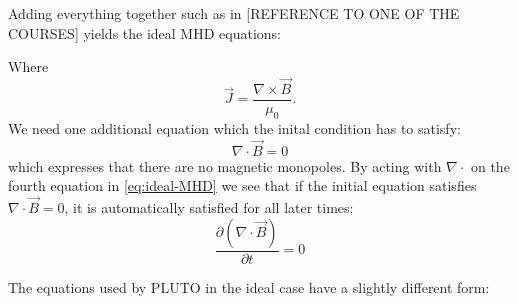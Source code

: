 Adding everything together such as in [REFERENCE TO ONE OF THE COURSES] yields the ideal MHD equations:

{\centering 
\noindent {}
\par}

Where $$\vec{J} = \frac{\nabla\times \vec{B}}{\mu_0}. $$ We need one additional equation which the inital condition has to satisfy:
\begin{equation*}
	\nabla\cdot\vec{B}=0
\end{equation*}
which expresses that there are no magnetic monopoles. By acting with $\nabla\cdot$ on the fourth equation in \autoref{eq:ideal-MHD} we see that if the initial equation satisfies $\nabla\cdot\vec{B}=0$, it is automatically satisfied for all later times:
\begin{equation*}
	\frac{\partial (\nabla\cdot\vec{B})}{\partial t} = 0
\end{equation*}

The equations used by PLUTO in the ideal case have a slightly different form: 

{\centering 
\noindent {}
\par}

